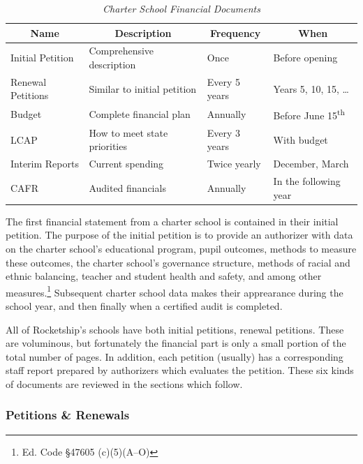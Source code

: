 \begin{table}[ht]
  \centering\small%
  \caption[Charter School Financial Documents]{\textit{Charter School Financial Documents}}\label{tab:charter-fin-docs}%
  \begin{tabular}{llll}
    \toprule%
    \multicolumn{1}{c}{Name}  & \multicolumn{1}{c}{Description} & \multicolumn{1}{c}{Frequency} & \multicolumn{1}{c}{When} \\
    \midrule%
    Initial Petition  & Comprehensive description    & Once           & Before opening \\
    Renewal Petitions & Similar to initial petition  & Every 5 years  & Years 5, 10, 15, \ldots \\
    Budget            & Complete financial plan      & Annually       & Before June 15\textsuperscript{th} \\
    LCAP              & How to meet state priorities & Every 3 years  & With budget\\
    Interim Reports   & Current spending             & Twice yearly   & December, March \\
    CAFR              & Audited financials           & Annually       & In the following year \\
    \bottomrule%
  \end{tabular}
\end{table}%

The first financial statement from a charter school is contained in their initial petition. The purpose of the initial petition is to provide an authorizer with data on the charter school's educational program, pupil outcomes, methods to measure these outcomes, the charter school's governance structure, methods of racial and ethnic balancing, teacher and student health and safety, and among other measures.\footnote{Ed. Code §47605 (c)(5)(A–O)} Subsequent charter school data makes their apprearance during the school year, and then finally when a certified audit is completed.

All of Rocketship's schools have both initial petitions, renewal petitions. These are voluminous, but fortunately the financial part is only a small portion of the total number of pages. In addition, each petition (usually) has a corresponding staff report prepared by authorizers which evaluates the petition. These six kinds of documents are reviewed in the sections which follow.

\subsubsection{Petitions \& Renewals}\label{sec:cs-petitions-renewals}\indent

